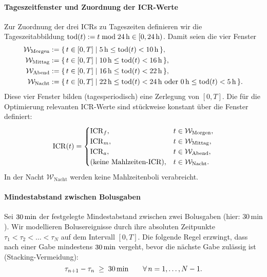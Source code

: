\paragraph{Tageszeitfenster und Zuordnung der ICR-Werte}
Zur Zuordnung der drei ICRs zu Tageszeiten definieren wir die Tageszeitabbildung \( \mathrm{tod}(t):= t \bmod 24\,\mathrm{h} \in [0,24\,\mathrm{h})\). Damit seien die vier Fenster
\[
\begin{aligned}
\mathcal{W}_{\mathrm{Morgen}} &:= \{\, t\in[0,T] \mid 5\,\mathrm{h} \le \mathrm{tod}(t) < 10\,\mathrm{h} \,\},\\
\mathcal{W}_{\mathrm{Mittag}} &:= \{\, t\in[0,T] \mid 10\,\mathrm{h} \le \mathrm{tod}(t) < 16\,\mathrm{h} \,\},\\
\mathcal{W}_{\mathrm{Abend}}  &:= \{\, t\in[0,T] \mid 16\,\mathrm{h} \le \mathrm{tod}(t) < 22\,\mathrm{h} \,\},\\
\mathcal{W}_{\mathrm{Nacht}}  &:= \{\, t\in[0,T] \mid 22\,\mathrm{h} \le \mathrm{tod}(t) < 24\,\mathrm{h} \ \text{oder}\ 0\,\mathrm{h} \le \mathrm{tod}(t) < 5\,\mathrm{h} \,\}.
\end{aligned}
\]
Diese vier Fenster bilden (tagesperiodisch) eine Zerlegung von \([0,T]\). Die für die Optimierung relevanten ICR-Werte sind stückweise konstant über die Fenster definiert:
\[
\mathrm{ICR}(t)=
\begin{cases}
\mathrm{ICR}_f, & t \in \mathcal{W}_{\mathrm{Morgen}},\\
\mathrm{ICR}_m, & t \in \mathcal{W}_{\mathrm{Mittag}},\\
\mathrm{ICR}_a, & t \in \mathcal{W}_{\mathrm{Abend}},\\
\text{(keine Mahlzeiten-ICR)}, & t \in \mathcal{W}_{\mathrm{Nacht}}.
\end{cases}
\]
\noindent In der Nacht \(\mathcal{W}_{\mathrm{Nacht}}\) werden keine Mahlzeitenboli verabreicht.
\medskip

\paragraph{Mindestabstand zwischen Bolusgaben}
Sei \(30\,\mathrm{min}\) der festgelegte Mindestabstand zwischen zwei Bolusgaben (hier: \(30\,\mathrm{min}\)). Wir modellieren Bolusereignisse durch ihre absoluten Zeitpunkte \(\tau_1<\tau_2<\dots<\tau_N\) auf dem Intervall \([0,T]\). Die folgende Regel erzwingt, dass nach einer Gabe mindestens \(30\,\mathrm{min}\) vergeht, bevor die nächste Gabe zulässig ist (Stacking-Vermeidung):
\[
\tau_{n+1} - \tau_n \;\ge\; 30\,\mathrm{min} \qquad \forall\, n=1,\dots,N-1.
\]

\newcommand{\Hgate}{60\,\mathrm{min}}             %
\newcommand{\Kg}{K_{\mathrm{gate}}}               %
\newcommand{\gammalow}{\gamma_{\mathrm{low}}}     %